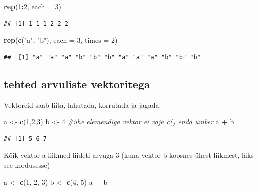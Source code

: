 \documentclass[]{book}
\newenvironment{Shaded}{\begin{snugshade}}{\end{snugshade}}
\newcommand{\KeywordTok}[1]{\textcolor[rgb]{0.13,0.29,0.53}{\textbf{#1}}}
\newcommand{\DataTypeTok}[1]{\textcolor[rgb]{0.13,0.29,0.53}{#1}}
\newcommand{\DecValTok}[1]{\textcolor[rgb]{0.00,0.00,0.81}{#1}}
\newcommand{\StringTok}[1]{\textcolor[rgb]{0.31,0.60,0.02}{#1}}
\newcommand{\CommentTok}[1]{\textcolor[rgb]{0.56,0.35,0.01}{\textit{#1}}}
\newcommand{\OperatorTok}[1]{\textcolor[rgb]{0.81,0.36,0.00}{\textbf{#1}}}
\newcommand{\NormalTok}[1]{#1}
\begin{document}
\begin{Shaded}
\begin{Highlighting}[]
\KeywordTok{rep}\NormalTok{(}\DecValTok{1}\OperatorTok{:}\DecValTok{2}\NormalTok{, }\DataTypeTok{each =} \DecValTok{3}\NormalTok{)}
\end{Highlighting}
\end{Shaded}

\begin{verbatim}
## [1] 1 1 1 2 2 2
\end{verbatim}

\begin{Shaded}
\begin{Highlighting}[]
\KeywordTok{rep}\NormalTok{(}\KeywordTok{c}\NormalTok{(}\StringTok{"a"}\NormalTok{, }\StringTok{"b"}\NormalTok{), }\DataTypeTok{each =} \DecValTok{3}\NormalTok{, }\DataTypeTok{times =} \DecValTok{2}\NormalTok{)}
\end{Highlighting}
\end{Shaded}

\begin{verbatim}
##  [1] "a" "a" "a" "b" "b" "b" "a" "a" "a" "b" "b" "b"
\end{verbatim}

\subsection{tehted arvuliste
vektoritega}\label{tehted-arvuliste-vektoritega}

Vektoreid saab liita, lahutada, korrutada ja jagada.

\begin{Shaded}
\begin{Highlighting}[]
\NormalTok{a <-}\StringTok{ }\KeywordTok{c}\NormalTok{(}\DecValTok{1}\NormalTok{,}\DecValTok{2}\NormalTok{,}\DecValTok{3}\NormalTok{)}
\NormalTok{b <-}\StringTok{ }\DecValTok{4} \CommentTok{#ühe elemendiga vektor ei vaja c() enda ümber}
\NormalTok{a }\OperatorTok{+}\StringTok{ }\NormalTok{b}
\end{Highlighting}
\end{Shaded}

\begin{verbatim}
## [1] 5 6 7
\end{verbatim}

Kõik vektor a liikmed liideti arvuga 3 (kuna vektor b koosnes ühest
liikmest, läks see kordusesse)

\begin{Shaded}
\begin{Highlighting}[]
\NormalTok{a <-}\StringTok{ }\KeywordTok{c}\NormalTok{(}\DecValTok{1}\NormalTok{, }\DecValTok{2}\NormalTok{, }\DecValTok{3}\NormalTok{)}
\NormalTok{b <-}\StringTok{ }\KeywordTok{c}\NormalTok{(}\DecValTok{4}\NormalTok{, }\DecValTok{5}\NormalTok{) }
\NormalTok{a }\OperatorTok{+}\StringTok{ }\NormalTok{b}
\end{Highlighting}
\end{Shaded}
\end{document}
